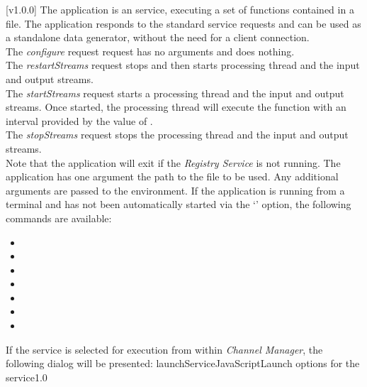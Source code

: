 [v1.0.0]
The  application is an  service,
executing a set of \JS{} functions contained in a file.
The application responds to the standard  service requests and can be used
as a standalone data generator, without the need for a client connection.\\

The \emph{configure} request request has no arguments and does nothing.\\

The \emph{restartStreams} request stops and then starts processing thread and the input
and output streams.\\

The \emph{startStreams} request starts a processing thread and the input and output
streams.
Once started, the processing thread will execute the  function with
an interval provided by the value of .\\

The \emph{stopStreams} request stops the processing thread and the input and output
streams.\\ 

Note that the application will exit if the \emph{Registry Service} is not running.
The application has one argument \longDash{} the path to the \JS{} file to be used.
Any additional arguments are passed to the \JS{} environment.
\insertAppParameters
\insertTagDescription{\JSIO}
\insertFilterServiceComment
\condPage{}
If the application is running from a terminal and has not been automatically started via
the `' option, the following commands are available:
\begin{itemize}
\item{}
\item\exSp{}
\item\exSp{}
\item\exSp{}
\item\exSp{}
\item\exSp{}
\item\exSp{}
\end{itemize}
\secondaryEnd
\condPage
{}
If the service is selected for execution from within \emph{Channel Manager}, the following
dialog will be presented:
%
{launchServiceJavaScript}{Launch options for the \JSIO{} service}{1.0}

